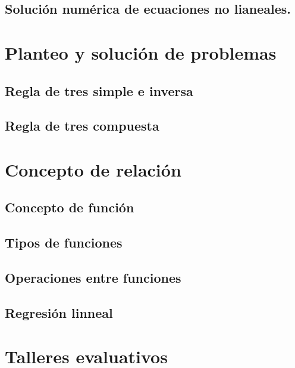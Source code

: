 \documentclass[
]{book}
\begin{document}
\hypertarget{soluciuxf3n-numuxe9rica-de-ecuaciones-no-lianeales.}{%
\section{Solución numérica de ecuaciones no lianeales.}\label{soluciuxf3n-numuxe9rica-de-ecuaciones-no-lianeales.}}

\hypertarget{planteo-y-soluciuxf3n-de-problemas}{%
\chapter{Planteo y solución de problemas}\label{planteo-y-soluciuxf3n-de-problemas}}

\hypertarget{regla-de-tres-simple-e-inversa}{%
\section{Regla de tres simple e inversa}\label{regla-de-tres-simple-e-inversa}}

\hypertarget{regla-de-tres-compuesta}{%
\section{Regla de tres compuesta}\label{regla-de-tres-compuesta}}

\hypertarget{concepto-de-relaciuxf3n}{%
\chapter{Concepto de relación}\label{concepto-de-relaciuxf3n}}

\hypertarget{concepto-de-funciuxf3n}{%
\section{Concepto de función}\label{concepto-de-funciuxf3n}}

\hypertarget{tipos-de-funciones}{%
\section{Tipos de funciones}\label{tipos-de-funciones}}

\hypertarget{operaciones-entre-funciones}{%
\section{Operaciones entre funciones}\label{operaciones-entre-funciones}}

\hypertarget{regresiuxf3n-linneal}{%
\section{Regresión linneal}\label{regresiuxf3n-linneal}}

\hypertarget{talleres-evaluativos}{%
\chapter{Talleres evaluativos}\label{talleres-evaluativos}}

  
\end{document}

